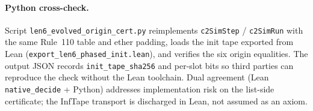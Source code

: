 \documentclass[11pt]{article}
\theoremstyle{remark}
\begin{document}
\begin{appendices}
\paragraph{Python cross-check.}
Script \texttt{len6\_evolved\_origin\_cert.py} reimplements \texttt{c2SimStep} / \texttt{c2SimRun}
with the same Rule~110 table and ether padding, loads the init tape exported from Lean
(\texttt{export\_len6\_phased\_init.lean}), and verifies the six origin equalities.
The output JSON records \texttt{init\_tape\_sha256} and per-slot bits so third parties can
reproduce the check without the Lean toolchain.
Dual agreement (Lean \texttt{native\_decide} + Python) addresses implementation risk on the
list-side certificate; the InfTape transport is discharged in Lean, not assumed as an axiom.

\end{appendices}



\end{document}
